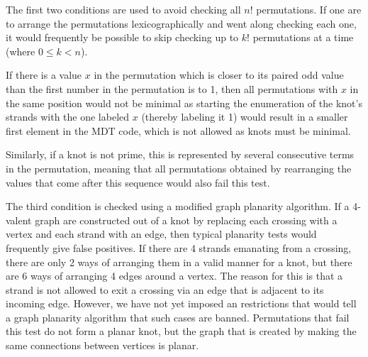 \begin{paper}
The first two conditions are used to avoid checking all $n!$ permutations.
If one are to arrange the permutations lexicographically and went along
checking each one, it would frequently be possible to skip checking up to $k!$
permutations at a time (where $0\leq k<n$).

If there is a value $x$ in the permutation which is closer to its paired odd
value than the first number in the permutation is to 1, then all permutations
with $x$ in the same position would not be minimal as starting the enumeration
of the knot's strands with the one labeled $x$ (thereby labeling it 1) would
result in a smaller first element in the MDT code, which is not allowed as knots
must be minimal.

Similarly, if a knot is not prime, this is represented by several consecutive
terms in the permutation, meaning that all permutations obtained by rearranging
the values that come after this sequence would also fail this test.

The third condition is checked using a modified graph planarity algorithm.
If a 4-valent graph are constructed out of a knot by replacing each crossing
with a vertex and each strand with an edge, then typical planarity tests would
frequently give false positives.
If there are 4 strands emanating from a crossing, there are only 2 ways of
arranging them in a valid manner for a knot, but there are 6 ways of arranging
4 edges around a vertex.
The reason for this is that a strand is not allowed to exit a crossing via an
edge that is adjacent to its incoming edge.
However, we have not yet imposed an restrictions that would tell a graph
planarity algorithm that such cases are banned.
Permutations that fail this test do not form a planar knot, but the graph that
is created by making the same connections between vertices is planar.\\

\\



\end{paper}
